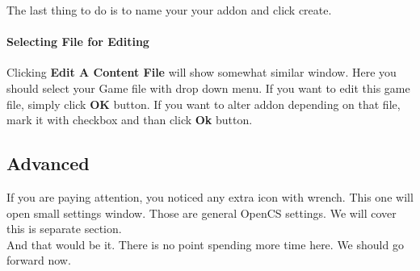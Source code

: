 The last thing to do is to name your your addon and click create.

\paragraph{Selecting File for Editing}
Clicking \textbf{Edit A Content File} will show somewhat similar window. Here you should select your Game file with drop down menu. If you want to edit this game file, simply click \textbf{OK} button. If you want to alter addon depending on that file, mark it with checkbox and than click \textbf{Ok} button.

\subsection{Advanced}
If you are paying attention, you noticed any extra icon with wrench. This one will open small settings window. Those are general OpenCS settings. We will cover this is separate section.\\

And that would be it. There is no point spending more time here. We should go forward now.